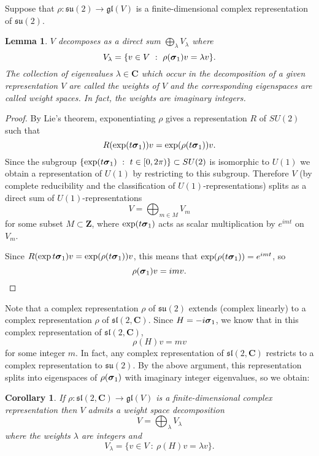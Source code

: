 \documentclass[12pt]{article}
\renewcommand\vec[1]{\ensuremath\boldsymbol{#1}}
\newcommand{\CC}{\mathbf{C}}
\newcommand{\ZZ}{\mathbf{Z}}
\newtheorem{lma}[thm]{Lemma}
\newtheorem{cor}[thm]{Corollary}
\theoremstyle{definition}
\theoremstyle{check}
\theoremstyle{remark}
\theoremstyle{TheoremNum}
\begin{document}
Suppose that $\rho\colon\mathfrak{su}(2)\to\mathfrak{gl}(V)$ is a finite-dimensional complex representation of $\mathfrak{su}(2)$.

\begin{lma}\label{lma-splitting}
$V$ decomposes as a direct sum $\bigoplus_{\lambda}V_{\lambda}$ where
\[V_{\lambda}=\{v\in V\ :\ \rho(\vec{\sigma}_1)v=\lambda v\}.\]
The collection of eigenvalues $\lambda\in\CC$ which occur in the decomposition of a given representation $V$ are called the {\em weights} of $V$ and the corresponding eigenspaces are called {\em weight spaces}. In fact, the weights are imaginary integers.
\end{lma}
\begin{proof}
By Lie's theorem, exponentiating $\rho$ gives a representation $R$ of $SU(2)$ such that
\[R(\exp(t\vec{\sigma}_1))v=\exp(\rho(t\vec{\sigma}_1))v.\]
Since the subgroup $\{\exp(t\vec{\sigma}_1)\ :\ t\in[0,2\pi)\}\subset SU(2)$ is isomorphic to $U(1)$ we obtain a representation of $U(1)$ by restricting to this subgroup. Therefore $V$ (by complete reducibility and the classification of $U(1)$-representations) splits as a direct sum of $U(1)$-representations
\[V=\bigoplus_{m\in M}V_m\]
for some subset $M\subset\ZZ$, where $\exp(t\vec{\sigma}_1)$ acts as scalar multiplication by $e^{imt}$ on $V_m$.

Since $R(\exp t\vec{\sigma}_1)v=\exp(\rho(t\vec{\sigma}_1))v$, this means that $\exp(\rho(t\vec{\sigma}_1))=e^{imt}$, so
\[\rho(\vec{\sigma}_1)v=imv.\]
\end{proof}

Note that a complex representation $\rho$ of $\mathfrak{su}(2)$ extends (complex linearly) to a complex representation $\rho$ of $\mathfrak{sl}(2,\CC)$. Since $H=-i\vec{\sigma}_1$, we know that in this complex representation of $\mathfrak{sl}(2,\CC)$,
\[\rho(H)v=mv\]
for some integer $m$. In fact, any complex representation of $\mathfrak{sl}(2,\CC)$ restricts to a complex representation to $\mathfrak{su}(2)$. By the above argument, this representation splits into eigenspaces of $\rho(\vec{\sigma}_1)$ with imaginary integer eigenvalues, so we obtain:

\begin{cor}
If $\rho\colon\mathfrak{sl}(2,\CC)\to\mathfrak{gl}(V)$ is a finite-dimensional complex representation then $V$ admits a weight space decomposition
\[V=\bigoplus_{\lambda}V_{\lambda}\]
where the weights $\lambda$ are integers and
\[V_{\lambda}=\{v\in V\ :\ \rho(H)v=\lambda v\}.\]
\end{cor}
\end{document}
